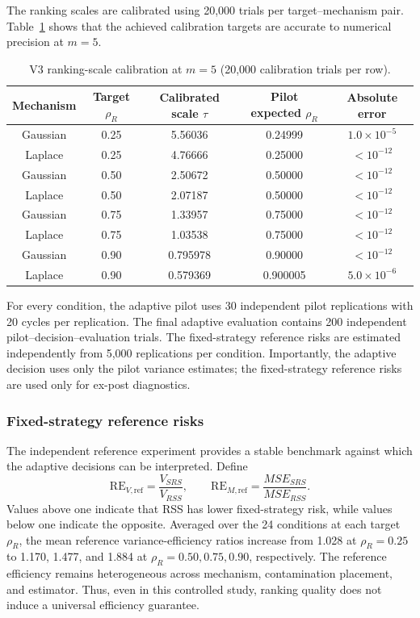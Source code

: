 \documentclass[12pt]{article}
\begin{document}
The ranking scales are calibrated using 20,000 trials per target--mechanism pair. Table~\ref{tab:v3_calibration} shows that the achieved calibration targets are accurate to numerical precision at $m=5$.

\begin{table}[htbp]
\centering
\caption{V3 ranking-scale calibration at $m=5$ (20,000 calibration trials per row).}
\label{tab:v3_calibration}
\begin{tabular}{ccccc}
\toprule
Mechanism & Target $\rho_R$ & Calibrated scale $\tau$ & Pilot expected $\rho_R$ & Absolute error \\
\midrule
Gaussian & 0.25 & 5.56036 & 0.24999 & $1.0\times10^{-5}$ \\
Laplace  & 0.25 & 4.76666 & 0.25000 & $<10^{-12}$ \\
Gaussian & 0.50 & 2.50672 & 0.50000 & $<10^{-12}$ \\
Laplace  & 0.50 & 2.07187 & 0.50000 & $<10^{-12}$ \\
Gaussian & 0.75 & 1.33957 & 0.75000 & $<10^{-12}$ \\
Laplace  & 0.75 & 1.03538 & 0.75000 & $<10^{-12}$ \\
Gaussian & 0.90 & 0.795978 & 0.90000 & $<10^{-12}$ \\
Laplace  & 0.90 & 0.579369 & 0.900005 & $5.0\times10^{-6}$ \\
\bottomrule
\end{tabular}
\end{table}

For every condition, the adaptive pilot uses 30 independent pilot replications with 20 cycles per replication. The final adaptive evaluation contains 200 independent pilot--decision--evaluation trials. The fixed-strategy reference risks are estimated independently from 5,000 replications per condition. Importantly, the adaptive decision uses only the pilot variance estimates; the fixed-strategy reference risks are used only for ex-post diagnostics.

\subsubsection{Fixed-strategy reference risks}
The independent reference experiment provides a stable benchmark against which the adaptive decisions can be interpreted. Define
\[
\mathrm{RE}_{V,\mathrm{ref}}=\frac{V_{SRS}}{V_{RSS}},
\qquad
\mathrm{RE}_{M,\mathrm{ref}}=\frac{MSE_{SRS}}{MSE_{RSS}}.
\]
Values above one indicate that RSS has lower fixed-strategy risk, while values below one indicate the opposite. Averaged over the 24 conditions at each target $\rho_R$, the mean reference variance-efficiency ratios increase from 1.028 at $\rho_R=0.25$ to 1.170, 1.477, and 1.884 at $\rho_R=0.50,0.75,0.90$, respectively. The reference efficiency remains heterogeneous across mechanism, contamination placement, and estimator. Thus, even in this controlled study, ranking quality does not induce a universal efficiency guarantee.
\end{document}
